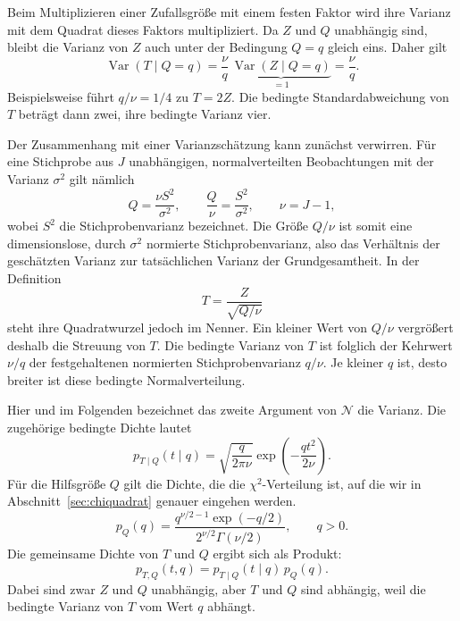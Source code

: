 Beim Multiplizieren einer Zufallsgröße mit einem festen Faktor wird
ihre Varianz mit dem Quadrat dieses Faktors multipliziert. Da $Z$
und $Q$ unabhängig sind, bleibt die Varianz von $Z$ auch unter der
Bedingung $Q=q$ gleich eins. Daher gilt
\begin{equation}
  \operatorname{Var}(T\mid Q=q)
  =\frac{\nu}{q}\,
    \underbrace{\operatorname{Var}(Z\mid Q=q)}_{=1}
  =\frac{\nu}{q}.
\end{equation}
Beispielsweise führt $q/\nu=1/4$ zu $T=2Z$. Die bedingte
Standardabweichung von $T$ beträgt dann zwei, ihre bedingte Varianz
vier.

Der Zusammenhang mit einer Varianzschätzung kann zunächst verwirren.
Für eine Stichprobe aus $J$ unabhängigen, normalverteilten
Beobachtungen mit der Varianz $\sigma^2$ gilt nämlich
\begin{equation}
  Q=\frac{\nu S^2}{\sigma^2},
  \qquad
  \frac{Q}{\nu}=\frac{S^2}{\sigma^2},
  \qquad
  \nu=J-1,
\end{equation}
wobei $S^2$ die Stichprobenvarianz bezeichnet. Die Größe $Q/\nu$
ist somit eine dimensionslose, durch $\sigma^2$ normierte
Stichprobenvarianz, also das Verhältnis der geschätzten Varianz zur tatsächlichen Varianz der Grundgesamtheit. In der Definition
\[
  T=\frac{Z}{\sqrt{Q/\nu}}
\]
steht ihre Quadratwurzel jedoch im Nenner. Ein kleiner Wert von
$Q/\nu$ vergrößert deshalb die Streuung von $T$. Die bedingte
Varianz von $T$ ist folglich der Kehrwert $\nu/q$ der festgehaltenen
normierten Stichprobenvarianz $q/\nu$. Je kleiner $q$ ist, desto
breiter ist diese bedingte Normalverteilung.

Hier und im Folgenden bezeichnet das zweite Argument von $\mathcal N$
die Varianz. Die zugehörige bedingte Dichte lautet
\begin{equation}
  p_{T\mid Q}(t\mid q)
  =\sqrt{\frac{q}{2\pi\nu}}
    \exp\!\left(-\frac{qt^2}{2\nu}\right).
  \label{eq:t_bedingte_dichte}
\end{equation}
Für die Hilfsgröße $Q$ gilt die Dichte, die die $\chi^2$-Verteilung ist, auf die wir in Abschnitt~\ref{sec:chiquadrat} genauer eingehen werden.
\begin{equation}
  p_Q(q)
  =\frac{q^{\nu/2-1}\exp(-q/2)}
         {2^{\nu/2}\Gamma(\nu/2)},
  \qquad q>0.
  \label{eq:t_chi2_dichte}
\end{equation}
Die gemeinsame Dichte von $T$ und $Q$ ergibt sich als Produkt:
\begin{equation}
  p_{T,Q}(t,q)=p_{T\mid Q}(t\mid q)\,p_Q(q).
  \label{eq:t_gemeinsame_dichte}
\end{equation}
Dabei sind zwar $Z$ und $Q$ unabhängig, aber $T$ und $Q$ sind abhängig,
weil die bedingte Varianz von $T$ vom Wert $q$ abhängt.

